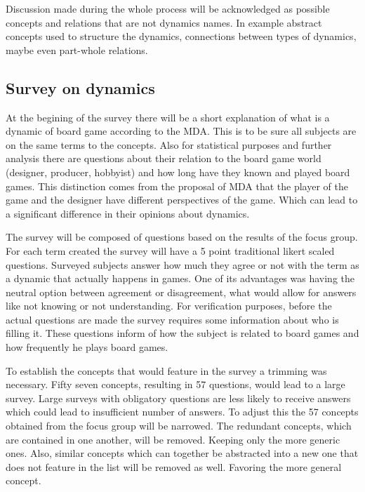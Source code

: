 Discussion made during the whole process will be acknowledged as possible concepts and relations that are not dynamics names. In example abstract concepts used to structure the dynamics, connections between types of dynamics, maybe even part-whole relations.



\subsection{Survey on dynamics}

At the begining of the survey there will be a short explanation of what is a dynamic of board game according to the MDA. This is to be sure all subjects are on the same terms to the concepts. Also for statistical purposes and further analysis there are questions about their relation to the board game world (designer, producer, hobbyist) and how long have they known and played board games. This distinction comes from the proposal of MDA that the player of the game and the designer have different perspectives of the game. Which can lead to a significant difference in their opinions about dynamics.

The survey will be composed of questions based on the results of the focus group. For each term created the survey will have a 5 point traditional likert scaled questions. Surveyed subjects answer how much they agree or not with the term as a dynamic that actually happens in games. One of its advantages was having the neutral option between agreement or disagreement, what would allow for answers like not knowing or not understanding. For verification purposes, before the actual questions are made the survey requires some information about who is filling it. These questions inform of how the subject is related to board games and how frequently he plays board games. \citep{devellis2016scale}

To establish the concepts that would feature in the survey a trimming was necessary. Fifty seven concepts, resulting in 57 questions, would lead to a large survey. Large surveys with obligatory questions are less likely to receive answers which could lead to insufficient number of answers. To adjust this the 57 concepts obtained from the focus group will be narrowed. The redundant concepts, which are contained in one another, will be removed. Keeping only the more generic ones. Also, similar concepts which can together be abstracted into a new one that does not feature in the list will be removed as well. Favoring the more general concept. \citep{malhotra2012pesquisaMarketing}

